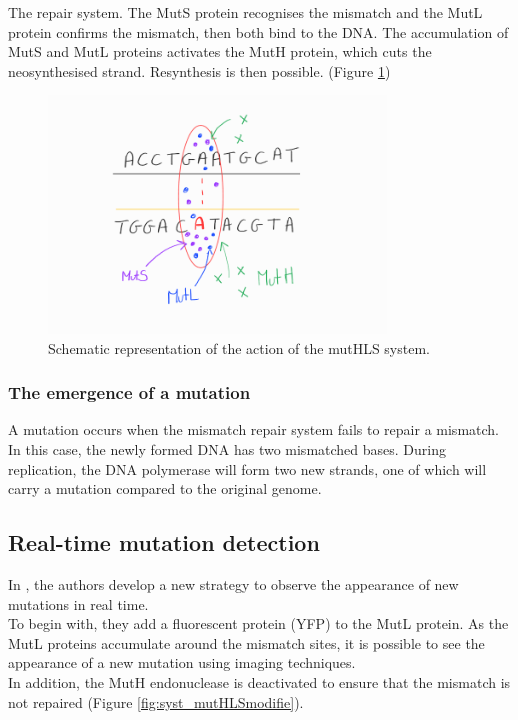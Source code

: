The repair system. The MutS protein recognises the mismatch and the MutL protein confirms the mismatch, then both bind to the DNA. The accumulation of MutS and MutL proteins activates the MutH protein, which cuts the neosynthesised strand. Resynthesis is then possible. (Figure \ref{fig:syst_mutHLS})

\begin{figure}
    \centering
    \includegraphics[width=0.8\textwidth]{pictures/syst_MutHLS.png}
    \caption{Schematic representation of the action of the mutHLS system.}
    \label{fig:syst_mutHLS}
\end{figure}


\subsubsection{The emergence of a mutation}

A mutation occurs when the mismatch repair system fails to repair a mismatch. In this case, the newly formed DNA has two mismatched bases. During replication, the DNA polymerase will form two new strands, one of which will carry a mutation compared to the original genome.
    
    \subsection{Real-time mutation detection}
    
    In \cite{robert2018mutation}, the authors develop a new strategy to observe the appearance of new mutations in real time. \\
    To begin with, they add a fluorescent protein (YFP) to the MutL protein. As the MutL proteins accumulate around the mismatch sites, it is possible to see the appearance of a new mutation using imaging techniques. \\
    In addition, the MutH endonuclease is deactivated to ensure that the mismatch is not repaired (Figure \ref{fig:syst_mutHLSmodifie}).

